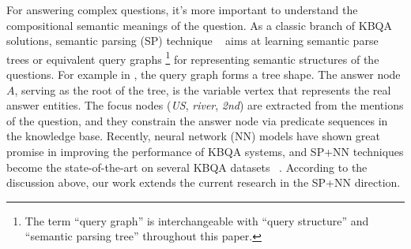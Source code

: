 For answering complex questions, it's more important to understand the compositional
semantic meanings of the question.
As a classic branch of KBQA solutions, semantic parsing (SP) technique
~\cite{berant2013semantic,yih2015semantic,reddy2016transforming,hu2018answering}
aims at learning semantic parse trees or equivalent query graphs
\footnote{The term ``query graph'' is interchangeable
with ``query structure'' and ``semantic parsing tree'' throughout this paper.}
for representing semantic structures of the questions.
For example in , the query graph forms a tree shape.
The answer node $A$, serving as the root of the tree,
is the variable vertex that represents the real answer entities.
The focus nodes (\textit{US}, \textit{river}, \textit{2nd})
are extracted from the mentions of the question,
and they constrain the answer node via predicate sequences in the knowledge base.
Recently, neural network (NN) models have shown great promise in
improving the performance of KBQA systems,
and SP+NN techniques become the state-of-the-art on several KBQA datasets
~\cite{qu2018question,bao2016constraint}.
According to the discussion above, 
our work extends the current research in the SP+NN direction.






